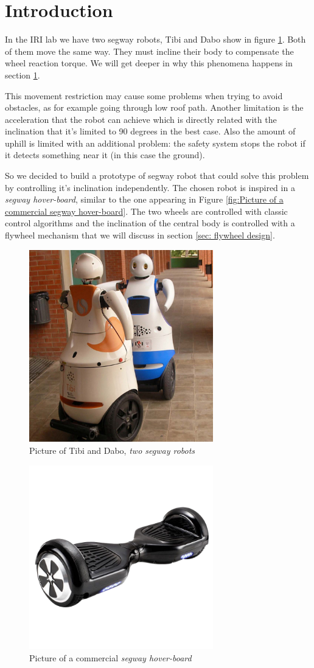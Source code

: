 \section{Introduction}
In the IRI lab we have two segway robots, Tibi and Dabo show in figure
\ref{fig:Picture of Tibi and Dabo}. Both of them move the same way.
They must incline their body to compensate the wheel reaction torque. We will get deeper
in why this phenomena happens in section \ref{}.

This movement restriction may cause some problems when trying to avoid obstacles,
as for example going through low roof path. Another limitation is the
acceleration that the robot can achieve which is directly related with the inclination
that it's limited to 90 degrees in the best case. Also the amount of uphill
is limited with an additional problem: the safety system stops the robot if 
it detects something near it (in this case the ground).

So we decided to build a prototype of segway robot that could solve this problem by 
controlling it's inclination independently. The chosen robot is inspired in a
\textit{segway hover-board}, similar to the one appearing in Figure \ref{fig:Picture of a commercial 
segway hover-board}. The two wheels are controlled with classic control algorithms and the
inclination of the central body is controlled with a flywheel mechanism that we will
discuss in section \ref{sec: flywheel design}.
\begin{figure}
	\centering
	\includegraphics[width=8cm]{img/robots-TIBI-i-DABO-IRI-red.jpg}
	\caption{Picture of Tibi and Dabo, \textit{two segway robots} }
	\label{fig:Picture of Tibi and Dabo}
\end{figure}

\begin{figure}
	\centering
	\includegraphics[width=8cm]{img/segway_hoverboard_picture.png}
	\caption{Picture of a commercial \textit{segway hover-board} }
	\label{fig:Picture of a commercial segway hover-board}
\end{figure}
